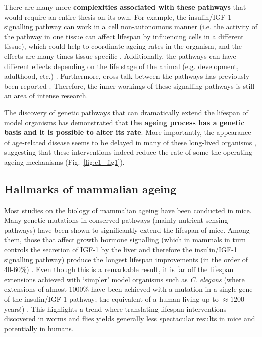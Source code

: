 \bigskip

There are many more \textbf{complexities associated with these pathways} that would require an entire thesis on its own. For example, the insulin/IGF-1 signalling pathway can work in a cell non-autonomous manner (i.e. the activity of the pathway in one tissue can affect lifespan by influencing cells in a different tissue), which could help to coordinate ageing rates in the organism, and the effects are many times tissue-specific \cite{Kenyon2005,Kenyon2010}. Additionally, the pathways can have different effects depending on the life stage of the animal (e.g. development, adulthood, etc.) \cite{Dillin2002}. Furthermore, cross-talk between the pathways has previously been reported \cite{Bonkowski2016, Greer2007}. Therefore, the inner workings of these signalling pathways is still an area of intense research.

\bigskip

The discovery of genetic pathways that can dramatically extend the lifespan of model organisms has demonstrated that \textbf{the ageing process has a genetic basis and it is possible to alter its rate}. More importantly, the appearance of age-related disease seems to be delayed in many of these long-lived organisms \cite{Kenyon2010,Arantes-Oliveira2003}, suggesting that these interventions indeed reduce the rate of some the operating ageing mechanisms (Fig.~\ref{fig:c1_fig1}). 

\smallskip

\subsection{Hallmarks of mammalian ageing} \label{s:1.1.3}

\smallskip

Most studies on the biology of mammalian ageing have been conducted in mice. Many genetic mutations in conserved pathways (mainly nutrient-sensing pathways) have been shown to significantly extend the lifespan of mice. Among them, those that affect growth hormone signalling (which in mammals in turn controls the secretion of IGF-1 by the liver and therefore the insulin/IGF-1 signalling pathway) produce the longest lifespan improvements (in the order of 40-60\%) \cite{Singh2019}. Even though this is a remarkable result, it is far off the lifespan extensions achieved with `simpler' model organisms such as \textit{C. elegans} (where extensions of almost 1000\% have been achieved with a mutation in a single gene of the insulin/IGF-1 pathway; the equivalent of a human living up to $\approx 1200$ years!) \cite{Ayyadevara2008}. This highlights a trend where translating lifespan interventions discovered in worms and flies yields generally less spectacular results in mice and potentially in humans.

